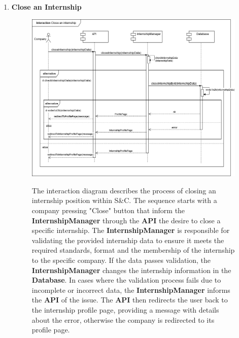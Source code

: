 \begin{enumerate}
    \newpage
    \item \textbf{Close an Internship}
    \begin{figure}[h!]
            \centering  \includegraphics[width=1\textwidth]{DD/Images/Interactions/INT10_CloseInternship.drawio.png}
            \label{fig:ComponentViewDiagram}
            \caption*{The interaction diagram describes the process of closing an internship position within S\&C. The sequence starts with a company pressing "Close" button that inform the \textbf{InternshipManager} through the \textbf{API} the desire to close a specific internship. 
            The \textbf{InternshipManager} is responsible for validating the provided internship data to ensure it meets the required standards, format and the membership of the internship to the specific company. If the data passes validation, the \textbf{InternshipManager} changes the internship information in the \textbf{Database}. In cases where the validation process fails due to incomplete or incorrect data, the \textbf{InternshipManager} informs the \textbf{API} of the issue. The \textbf{API} then redirects the user back to the internship profile page, providing a message with details about the error, otherwise the company is redirected to its profile page.
            }         
    \end{figure}


\end{enumerate}
